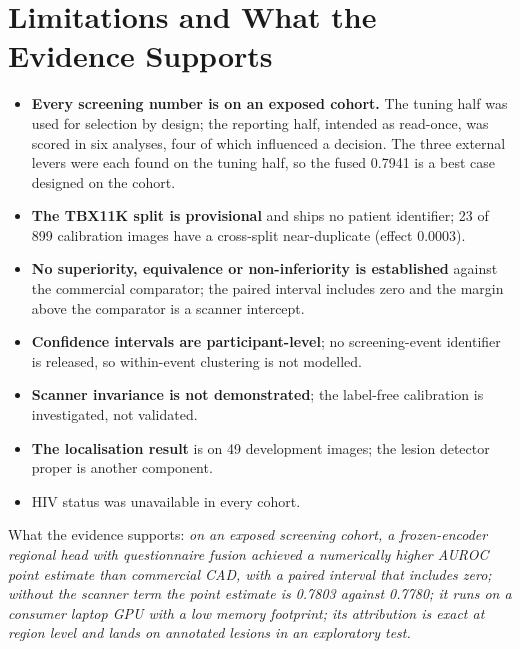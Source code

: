 \documentclass[12pt,a4paper]{report}
\begin{document}
\chapter{Limitations and What the Evidence Supports}
\begin{itemize}[leftmargin=1.4em,itemsep=1pt]
\item \textbf{Every screening number is on an exposed cohort.} The tuning half was used for selection by design; the reporting half, intended as read-once, was scored in six analyses, four of which influenced a decision. The three external levers were each found on the tuning half, so the fused 0.7941 is a best case designed on the cohort.
\item \textbf{The TBX11K split is provisional} and ships no patient identifier; 23 of 899 calibration images have a cross-split near-duplicate (effect 0.0003).
\item \textbf{No superiority, equivalence or non-inferiority is established} against the commercial comparator; the paired interval includes zero and the margin above the comparator is a scanner intercept.
\item \textbf{Confidence intervals are participant-level}; no screening-event identifier is released, so within-event clustering is not modelled.
\item \textbf{Scanner invariance is not demonstrated}; the label-free calibration is investigated, not validated.
\item \textbf{The localisation result} is on 49 development images; the lesion detector proper is another component.
\item HIV status was unavailable in every cohort.
\end{itemize}
What the evidence supports: \emph{on an exposed screening cohort, a frozen-encoder regional head with questionnaire fusion achieved a numerically higher AUROC point estimate than commercial CAD, with a paired interval that includes zero; without the scanner term the point estimate is 0.7803 against 0.7780; it runs on a consumer laptop GPU with a low memory footprint; its attribution is exact at region level and lands on annotated lesions in an exploratory test.}

\end{document}
